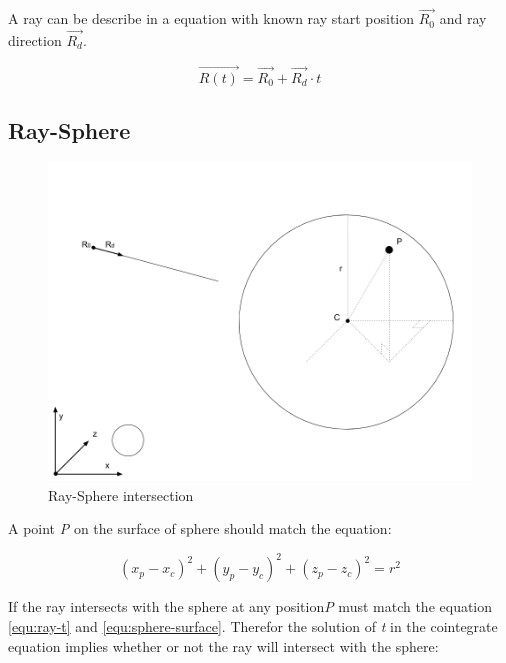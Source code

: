 A ray can be describe in a equation with known ray start position \emph{$\overrightarrow{R_0}$} and ray direction \emph{$\overrightarrow{R_d}$}.

\begin{equation}\label{equ:ray-t}
\overrightarrow{R(t)} = \overrightarrow{R_0} + \overrightarrow{R_d} \cdot t
\end{equation}

\subsection{Ray-Sphere}

\begin{figure}[H]\label{fig:ray-sphere}
\centering
\includegraphics[width=\linewidth]{Figures/ray-sphere-intersection.png}
\decoRule
\caption[ray-sphere-intersection]{Ray-Sphere intersection}
\end{figure}

A point \emph{P} on the surface of sphere should match the equation:

\begin{equation}\label{equ:sphere-surface}
(x_p - x_c)^2 + (y_p - y_c)^2 + (z_p - z_c)^2 = r^2
\end{equation}

If the ray intersects with the sphere at any position\emph{P} must match the equation \ref{equ:ray-t} and \ref{equ:sphere-surface}. Therefor the solution of \emph{t} in the cointegrate equation implies whether or not the ray will intersect with the sphere:

